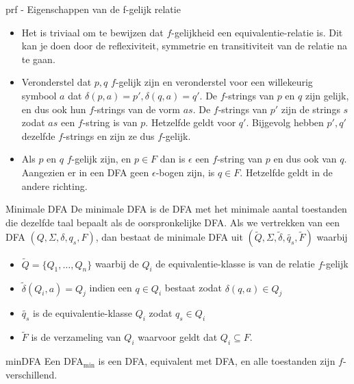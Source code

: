 \begin{prf}{prf - Eigenschappen van de f-gelijk relatie}
    \begin{itemize}
        \item Het is triviaal om te bewijzen dat $f$-gelijkheid een equivalentie-relatie is. Dit kan je doen door de reflexiviteit, symmetrie en transitiviteit van de relatie na te gaan.
        \item Veronderstel dat $p,q$ $f$-gelijk zijn en veronderstel voor een willekeurig symbool $a$ dat \(\delta(p,a) = p', \delta(q,a) = q'\). De $f$-strings van $p$ en $q$ zijn gelijk,
              en dus ook hun $f$-strings van de vorm $as$. De $f$-strings van $p'$ zijn de strings $s$ zodat $as$ een $f$-string is van $p$.
              Hetzelfde geldt voor $q'$. Bijgevolg hebben $p',q'$ dezelfde $f$-strings en zijn ze dus $f$-gelijk.
        \item Als $p$ en $q$ $f$-gelijk zijn, en $p \in F$ dan is $\epsilon$ een $f$-string van $p$ en dus ook van $q$. Aangezien er in een DFA geen $\epsilon$-bogen zijn, is $q \in F$.
              Hetzelfde geldt in de andere richting. 
    \end{itemize}
    \vspace{-0.3cm}
\end{prf}

\begin{theo}{Minimale DFA}
    De minimale DFA is de DFA met het minimale aantal toestanden die dezelfde taal bepaalt als de oorspronkelijke DFA\@. Als we vertrekken van een DFA $(Q,\Sigma, \delta, q_s, F)$, dan bestaat de minimale DFA uit $(\tilde{Q},\Sigma, \tilde{\delta}, \tilde{q_s}, \tilde{F})$ waarbij
    \begin{itemize}
        \item $\tilde{Q} = \{Q_1, \ldots, Q_n\}$ waarbij de $Q_i$ de equivalentie-klasse is van de relatie $f$-gelijk
        \item $\tilde{\delta}(Q_i,a) = Q_j$ indien een $q \in Q_i$ bestaat zodat $\delta(q,a) \in Q_j$
        \item $\tilde{q_s}$ is de equivalentie-klasse $Q_i$ zodat $q_s \in Q_i$
        \item $\tilde{F}$ is de verzameling van $Q_i$ waarvoor geldt dat $Q_i \subseteq F$. 
    \end{itemize}
    \vspace{-0.3cm}
\end{theo}

\begin{lem}{minDFA}
    Een DFA$_{\text{min}}$ is een DFA, equivalent met DFA, en alle toestanden zijn $f$-verschillend.
\end{lem}

